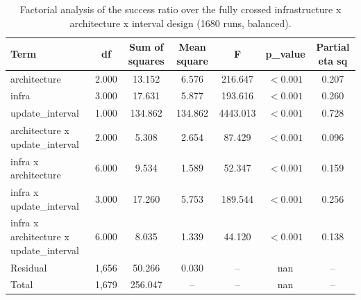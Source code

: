 \begin{table}
\centering
\footnotesize
\caption{Factorial analysis of the success ratio over the fully crossed infrastructure x architecture x interval design (1680 runs, balanced).}
\label{tab:p1-hetero-interaction}
\begin{tabular}{lcccccc}
\toprule
Term & df & Sum of squares & Mean square & F & p\_value & Partial eta sq \\
\midrule
architecture & 2.000 & 13.152 & 6.576 & 216.647 & $<0.001$ & 0.207 \\
infra & 3.000 & 17.631 & 5.877 & 193.616 & $<0.001$ & 0.260 \\
update\_interval & 1.000 & 134.862 & 134.862 & 4443.013 & $<0.001$ & 0.728 \\
architecture x update\_interval & 2.000 & 5.308 & 2.654 & 87.429 & $<0.001$ & 0.096 \\
infra x architecture & 6.000 & 9.534 & 1.589 & 52.347 & $<0.001$ & 0.159 \\
infra x update\_interval & 3.000 & 17.260 & 5.753 & 189.544 & $<0.001$ & 0.256 \\
infra x architecture x update\_interval & 6.000 & 8.035 & 1.339 & 44.120 & $<0.001$ & 0.138 \\
Residual & 1,656 & 50.266 & 0.030 & -- & nan & -- \\
Total & 1,679 & 256.047 & -- & -- & nan & -- \\
\bottomrule
\end{tabular}
\par\vspace{2pt}{\footnotesize\raggedright The profile x interval interaction is the formal statement that the temporal configuration changes the sign of the architectural effect; it cannot be read off the main effects.\par}
\end{table}
